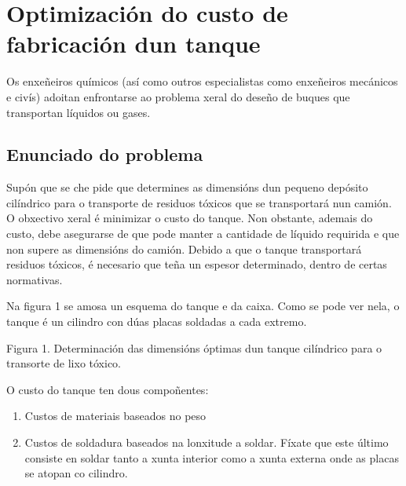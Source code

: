 \documentclass[
  letterpaper,
  DIV=11,
  numbers=noendperiod]{scrartcl}
\author{}
\date{}
\providecommand{\tightlist}{%
  \setlength{\itemsep}{0pt}\setlength{\parskip}{0pt}}\usepackage{longtable,booktabs,array}
\begin{document}
\ifdefined\Shaded\renewenvironment{Shaded}{\begin{tcolorbox}[boxrule=0pt, interior hidden, borderline west={3pt}{0pt}{shadecolor}, enhanced, breakable, frame hidden, sharp corners]}{\end{tcolorbox}}\fi

\hypertarget{optimizaciuxf3n-do-custo-de-fabricaciuxf3n-dun-tanque}{%
\section{Optimización do custo de fabricación dun
tanque}\label{optimizaciuxf3n-do-custo-de-fabricaciuxf3n-dun-tanque}}

Os enxeñeiros químicos (así como outros especialistas como enxeñeiros
mecánicos e civís) adoitan enfrontarse ao problema xeral do deseño de
buques que transportan líquidos ou gases.

\hypertarget{enunciado-do-problema}{%
\subsection{Enunciado do problema}\label{enunciado-do-problema}}

Supón que se che pide que determines as dimensións dun pequeno depósito
cilíndrico para o transporte de residuos tóxicos que se transportará nun
camión. O obxectivo xeral é minimizar o custo do tanque. Non obstante,
ademais do custo, debe asegurarse de que pode manter a cantidade de
líquido requirida e que non supere as dimensións do camión. Debido a que
o tanque transportará residuos tóxicos, é necesario que teña un espesor
determinado, dentro de certas normativas.

Na figura 1 se amosa un esquema do tanque e da caixa. Como se pode ver
nela, o tanque é un cilindro con dúas placas soldadas a cada extremo.

Figura 1. Determinación das dimensións óptimas dun tanque cilíndrico
para o transorte de lixo tóxico.

O custo do tanque ten dous compoñentes:

\begin{enumerate}
\def\labelenumi{\arabic{enumi}.}
\tightlist
\item
  Custos de materiais baseados no peso
\item
  Custos de soldadura baseados na lonxitude a soldar. Fíxate que este
  último consiste en soldar tanto a xunta interior como a xunta externa
  onde as placas se atopan co cilindro.
\end{enumerate}
\end{document}
